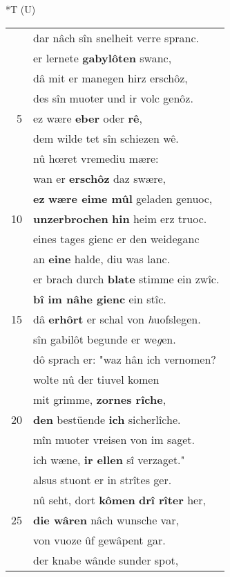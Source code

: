 \documentclass[8pt,a4paper,notitlepage]{article}
\begin{document}
\begin{table}[ht]
\begin{minipage}[t]{0.5\linewidth}
\end{minipage}
\hspace{0.5cm}
\begin{minipage}[t]{0.5\linewidth}
\small
\begin{center}*T (U)
\end{center}
\begin{tabular}{rl}
 & dar nâch sîn snelheit verre spranc.\\ 
 & er lernete \textbf{gabylôten} swanc,\\ 
 & dâ mit er manegen hirz erschôz,\\ 
 & des sîn muoter und ir volc genôz.\\ 
5 & ez wære \textbf{eber} oder \textbf{rê},\\ 
 & dem wilde tet sîn schiezen wê.\\ 
 & nû hœret vremediu mære:\\ 
 & wan er \textbf{erschôz} daz swære,\\ 
 & \textbf{ez} \textbf{wære eime mûl} geladen genuoc,\\ 
10 & \textbf{unzerbrochen} \textbf{hin} heim erz truoc.\\ 
 & eines tages gienc er den weideganc\\ 
 & an \textbf{eine} halde, diu was lanc.\\ 
 & er brach durch \textbf{blate} stimme ein zwîc.\\ 
 & \textbf{bî im nâhe gienc} ein stîc.\\ 
15 & dâ \textbf{erhôrt} er schal von \textit{h}uofslegen.\\ 
 & sîn gabilôt begunde er we\textit{g}en.\\ 
 & dô sprach er: "waz hân ich vernomen?\\ 
 & wolte nû der tiuvel komen\\ 
 & mit grimme, \textbf{zornes rîche},\\ 
20 & \textbf{den} bestüende \textbf{ich} sicherlîche.\\ 
 & mîn muoter vreisen von im saget.\\ 
 & ich wæne, \textbf{ir ellen} sî verzaget."\\ 
 & alsus stuont er in strîtes ger.\\ 
 & nû seht, dort \textbf{kômen} \textbf{drî rîter} her,\\ 
25 & \textbf{die wâren} nâch wunsche var,\\ 
 & von vuoze ûf gewâpent gar.\\ 
 & der knabe wânde sunder spot,\\ 

\end{tabular}
\end{minipage}
\end{table}
\end{document}
